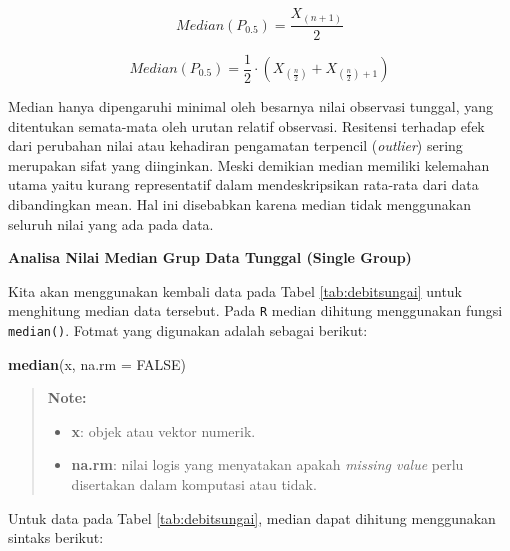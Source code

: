 \documentclass[]{book}
\newenvironment{Shaded}{\begin{snugshade}}{\end{snugshade}}
\newcommand{\KeywordTok}[1]{\textcolor[rgb]{0.13,0.29,0.53}{\textbf{#1}}}
\newcommand{\DataTypeTok}[1]{\textcolor[rgb]{0.13,0.29,0.53}{#1}}
\newcommand{\OtherTok}[1]{\textcolor[rgb]{0.56,0.35,0.01}{#1}}
\newcommand{\OperatorTok}[1]{\textcolor[rgb]{0.81,0.36,0.00}{\textbf{#1}}}
\newcommand{\NormalTok}[1]{#1}
\providecommand{\tightlist}{%
  \setlength{\itemsep}{0pt}\setlength{\parskip}{0pt}}
\begin{document}
\begin{equation}
  Median (P_{0.5}) =\frac{X_{\left(n+1\right)}}{2}
  \label{eq:med1}
\end{equation}

\begin{equation}
  Median (P_{0.5}) =\frac{1}{2}\cdot\left(X_{\left(\frac{n}{2}\right)}+X_{\left(\frac{n}{2}\right)+1}\right)
  \label{eq:med2}
\end{equation}

Median hanya dipengaruhi minimal oleh besarnya nilai observasi tunggal,
yang ditentukan semata-mata oleh urutan relatif observasi. Resitensi
terhadap efek dari perubahan nilai atau kehadiran pengamatan terpencil
(\emph{outlier}) sering merupakan sifat yang diinginkan. Meski demikian
median memiliki kelemahan utama yaitu kurang representatif dalam
mendeskripsikan rata-rata dari data dibandingkan mean. Hal ini
disebabkan karena median tidak menggunakan seluruh nilai yang ada pada
data.

\textbf{Analisa Nilai Median Grup Data Tunggal (Single Group)}

Kita akan menggunakan kembali data pada Tabel \ref{tab:debitsungai}
untuk menghitung median data tersebut. Pada \texttt{R} median dihitung
menggunakan fungsi \texttt{median()}. Fotmat yang digunakan adalah
sebagai berikut:

\begin{Shaded}
\begin{Highlighting}[]
\KeywordTok{median}\NormalTok{(x, }\DataTypeTok{na.rm =} \OtherTok{FALSE}\NormalTok{)}
\end{Highlighting}
\end{Shaded}

\begin{quote}
\textbf{Note:}

\begin{itemize}
\tightlist
\item
  \textbf{x}: objek atau vektor numerik.
\item
  \textbf{na.rm}: nilai logis yang menyatakan apakah \emph{missing
  value} perlu disertakan dalam komputasi atau tidak.
\end{itemize}
\end{quote}

Untuk data pada Tabel \ref{tab:debitsungai}, median dapat dihitung
menggunakan sintaks berikut:

\begin{Shaded}
\end{Shaded}
\end{document}
